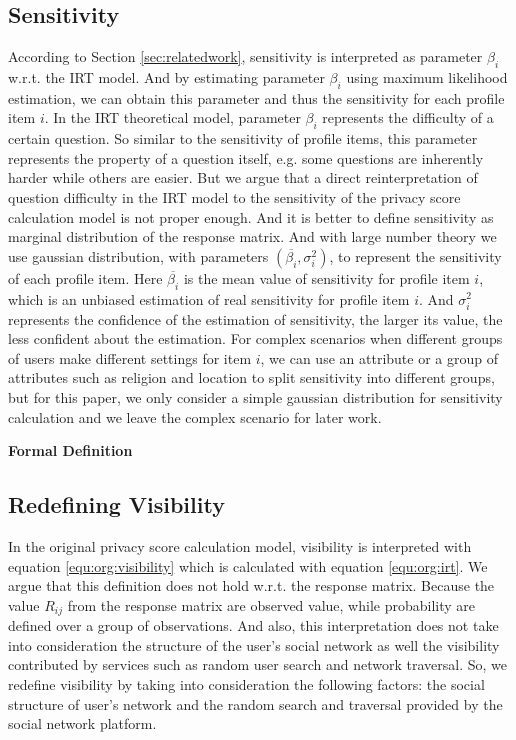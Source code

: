 \documentclass[a4paper]{article}
\begin{document}
\subsection{Sensitivity}
According to Section \ref{sec:relatedwork}, sensitivity is interpreted
as parameter $\beta_i$ w.r.t. the IRT model. And by estimating
parameter $\beta_i$ using maximum likelihood estimation, we can obtain
this parameter and thus the sensitivity for each profile item
$i$. In the IRT theoretical model, parameter $\beta_i$
represents the difficulty of a certain question. So similar to the
sensitivity of profile items, this parameter represents the
property of a question itself, e.g. some questions are inherently
harder while others are easier. But we argue that a direct
reinterpretation of question difficulty in the IRT model to the
sensitivity of the privacy score calculation model is not
proper enough. And it is better to define sensitivity as marginal
distribution of the response matrix. And with large number theory we
use gaussian distribution, with parameters $(\overline{\beta_i},\sigma
_i^2)$, to represent the sensitivity of each profile item. Here
$\overline{\beta_i}$ is the mean value of sensitivity for profile item
$i$, which is an unbiased estimation of real sensitivity for profile
item $i$. And $\sigma_i^2$ represents the confidence of the
estimation of sensitivity, the larger its value, the less confident
about the estimation. For complex scenarios when different groups of
users make different settings for item $i$, we can use an attribute or
a group of attributes such as religion and location to split
sensitivity into different groups, but for this paper, we only
consider a simple gaussian distribution for sensitivity calculation
and we leave the complex scenario for later work.

\textbf{Formal Definition}

\subsection{Redefining Visibility}
In the original privacy score calculation model, visibility is
interpreted with equation \ref{equ:org:visibility} which is calculated
with equation \ref{equ:org:irt}. We argue that this definition does
not hold w.r.t. the response matrix. Because the value $R_{ij}$ from
the response matrix are observed value, while probability are defined
over a group of observations. And also, this interpretation does not
take into consideration the structure of the user's social network as
well the visibility contributed by services such as random user search
and network traversal. So, we redefine visibility by taking into
consideration the following factors: the social structure of user's
network and the random search and traversal provided by the social
network platform.
\end{document}
